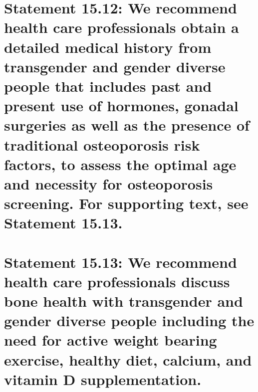 \documentclass[
]{book}
\begin{document}
\hypertarget{statement-15.12-we-recommend-health-care-professionals-obtain-a-detailed-medical-history-from-transgender-and-gender-diverse-people-that-includes-past-and-present-use-of-hormones-gonadal-surgeries-as-well-as-the-presence-of-traditional-osteoporosis-risk-factors-to-assess-the-optimal-age-and-necessity-for-osteoporosis-screening.-for-supporting-text-see-statement-15.13.}{%
\section*{Statement 15.12: We recommend health care professionals obtain a detailed medical history from transgender and gender diverse people that includes past and present use of hormones, gonadal surgeries as well as the presence of traditional osteoporosis risk factors, to assess the optimal age and necessity for osteoporosis screening. For supporting text, see Statement 15.13.}\label{statement-15.12-we-recommend-health-care-professionals-obtain-a-detailed-medical-history-from-transgender-and-gender-diverse-people-that-includes-past-and-present-use-of-hormones-gonadal-surgeries-as-well-as-the-presence-of-traditional-osteoporosis-risk-factors-to-assess-the-optimal-age-and-necessity-for-osteoporosis-screening.-for-supporting-text-see-statement-15.13.}}

\hypertarget{statement-15.13-we-recommend-health-care-professionals-discuss-bone-health-with-transgender-and-gender-diverse-people-including-the-need-for-active-weight-bearing-exercise-healthy-diet-calcium-and-vitamin-d-supplementation.}{%
\section*{Statement 15.13: We recommend health care professionals discuss bone health with transgender and gender diverse people including the need for active weight bearing exercise, healthy diet, calcium, and vitamin D supplementation.}\label{statement-15.13-we-recommend-health-care-professionals-discuss-bone-health-with-transgender-and-gender-diverse-people-including-the-need-for-active-weight-bearing-exercise-healthy-diet-calcium-and-vitamin-d-supplementation.}}
\end{document}
